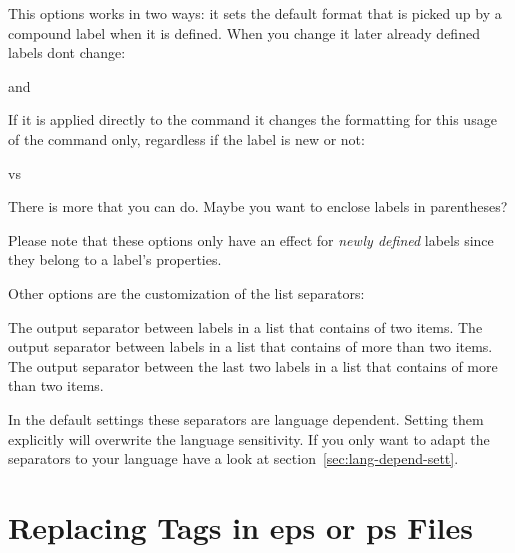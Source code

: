 \documentclass[load-preamble+,babel-options={ngerman,british,american}]{cnltx-doc}
\begin{document}
This options works in two ways: it sets the default format that is picked up
by a compound label when it is defined.  When you change it later already
defined labels dont change:
\begin{example}
   and 
\end{example}

If it is applied directly to the  command it changes the formatting
for this usage of the command only, regardless if the label is new or not:
\begin{example}
   vs
\end{example}

There is more that you can do.  Maybe you want to enclose labels in
parentheses?
\begin{example}
\end{example}
Please note that these options only have an effect for \emph{newly defined}
labels since they belong to a label's properties.

Other options are the customization of the list separators:
\begin{options}
    The output separator between labels in a list that contains of two items.
  \Default{\visualizespaces{, }}
    The output separator between labels in a list that contains of more than
    two items.
    The output separator between the last two labels in a list that contains
    of more than two items.
\end{options}

\begin{example}
\end{example}

In the default settings these separators are language dependent.  Setting them
explicitly will overwrite the language sensitivity.  If you only want to adapt
the separators to your language have a look at
section~\ref{sec:lang-depend-sett}.

\section{Replacing Tags in \acs{eps} or \acs{ps} Files}
\end{document}
